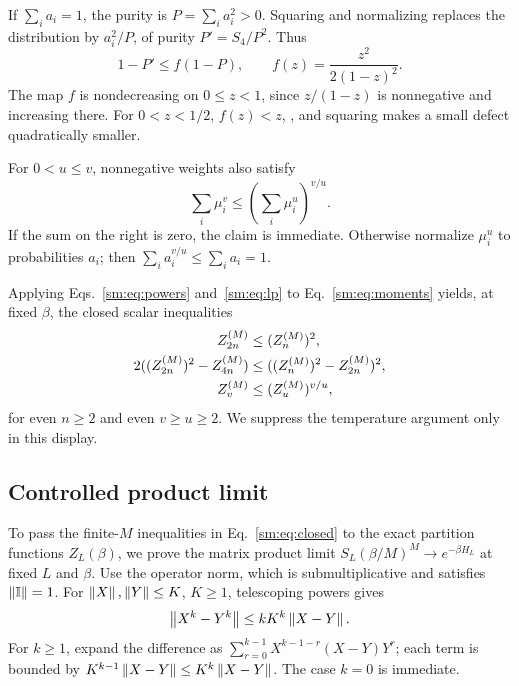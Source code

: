 If $\sum_i a_i=1$, the purity is $P=\sum_i a_i^2>0$.
Squaring and normalizing replaces the distribution by
$a_i^2/P$, of purity $P'=S_4/P^2$. Thus
\begin{equation}
 1-P'\le f(1-P),\qquad
 f(z)=\frac{z^2}{2(1-z)^2}.
 \label{sm:eq:squaring}
\end{equation}
The map $f$ is nondecreasing on $0\le z<1$, since
$z/(1-z)$ is nonnegative and increasing there. For $0<z<1/2$,
$f(z)<z$, \fcurve, and squaring makes a small defect quadratically
smaller.

For $0<u\le v$, nonnegative weights also satisfy
\begin{equation}
 \sum_i\mu_i^v\le\left(\sum_i\mu_i^u\right)^{v/u}.
 \label{sm:eq:lp}
\end{equation}
If the sum on the right is zero, the claim is immediate.
Otherwise normalize $\mu_i^u$ to probabilities $a_i$; then
$\sum_i a_i^{v/u}\le\sum_i a_i=1$.

Applying Eqs.~\eqref{sm:eq:powers} and~\eqref{sm:eq:lp} to
Eq.~\eqref{sm:eq:moments} yields, at fixed $\beta$, the closed scalar
inequalities
\begin{align}
 Z_{2n}^{(M)}&\le(Z_{n}^{(M)})^2, \notag\\
 2((Z_{2n}^{(M)})^2-Z_{4n}^{(M)})
 &\le((Z_{n}^{(M)})^2-Z_{2n}^{(M)})^2, \notag\\
 Z_{v}^{(M)}&\le(Z_{u}^{(M)})^{v/u},
 \label{sm:eq:closed}
\end{align}
for even $n\ge2$ and even $v\ge u\ge2$.
We suppress the temperature argument only in this display.

\subsection{Controlled product limit}
\label{sm:sec:limit}

To pass the finite-$M$ inequalities in Eq.~\eqref{sm:eq:closed} to the
exact partition functions $Z_L(\beta)$, we prove the matrix product
limit $S_L(\beta/M)^M\to e^{-\beta H_L}$ at fixed $L$ and $\beta$.
Use the operator norm, which is submultiplicative and satisfies
$\left\lVert \mathbb I\right\rVert=1$.
For $\left\lVert X\right\rVert,\left\lVert Y\right\rVert\le K$, $K\ge1$, telescoping powers
gives
\begin{equation}
 \left\lVert X^k-Y^k\right\rVert\le kK^k\left\lVert X-Y\right\rVert.
 \label{sm:eq:telescoping}
\end{equation}
For $k\ge1$, expand the difference as
$\sum_{r=0}^{k-1}X^{k-1-r}(X-Y)Y^r$; each term is bounded by
$K^{k-1}\left\lVert X-Y\right\rVert\le K^k\left\lVert X-Y\right\rVert$.
The case $k=0$ is immediate.


